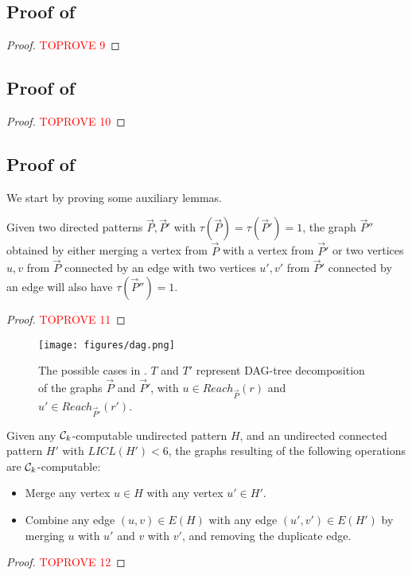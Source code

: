 \documentclass[a4paper,UKenglish,cleveref, autoref, numberwithinsect, thm-restate]{lipics-v2021}
\newcommand{\computable}[1]{${#1}$-computable}
\newcommand{\cycle}[1]{\cC_{#1}}
\newcommand{\LICL}{LICL}
\newcommand{\Reachable}{Reach}
\newcommand{\dtw}{\tau}
\newcommand{\dagtree}{DAG-tree decomposition}
\newcommand{\cC}{{\cal C}}
\begin{document}
	\subsection{Proof of }
	\sixseven*	
	\begin{proof}\textcolor{red}{TOPROVE 9}\end{proof}

	\subsection{Proof of }
	\cyclehom*
	\begin{proof}\textcolor{red}{TOPROVE 10}\end{proof}

	\subsection{Proof of }
	
	We start by proving some auxiliary lemmas.
	
		\begin{lemma} \label{lem:merge}
		Given two directed patterns $\vec{P},\vec{P}'$ with $\dtw(\vec{P}) = \dtw(\vec{P}') = 1$, the graph $\vec{P}''$ obtained by either merging a vertex from $\vec{P}$ with a vertex from $\vec{P}'$ or two vertices $u,v$ from $\vec{P}$ connected by an edge with two vertices $u',v'$ from $\vec{P}'$ connected by an edge will also have $\dtw(\vec{P}'') = 1$.
	\end{lemma}
	
	\begin{proof}\textcolor{red}{TOPROVE 11}\end{proof}
	
	\begin{figure}
		\centering
		\texttt{[image: figures/dag.png]}\caption{The possible cases in . $T$ and $T'$ represent \dagtree{} of the graphs $\vec{P}$ and $\vec{P}'$, with $u \in \Reachable_{\vec{P}}(r)$ and $u' \in \Reachable_{\vec{P}'}(r')$.}
		\label{fig:dag}
	\end{figure}
	
	
	\begin{lemma} \label{lem:complexpattern}
		Given any \computable{\cycle{k}} undirected pattern $H$, and an undirected connected pattern $H'$ with $\LICL(H')<6$, the graphs resulting of the following operations are \computable{\cycle{k}}:
		\begin{itemize}
			\item Merge any vertex $u \in H$ with any vertex $u' \in H'$.
			\item Combine any edge $(u,v) \in E(H)$ with any edge $(u',v') \in E(H')$ by merging $u$ with $u'$ and $v$ with $v'$, and removing the duplicate edge.
		\end{itemize}
	\end{lemma}
	\begin{proof}\textcolor{red}{TOPROVE 12}\end{proof}
	
\end{document}
